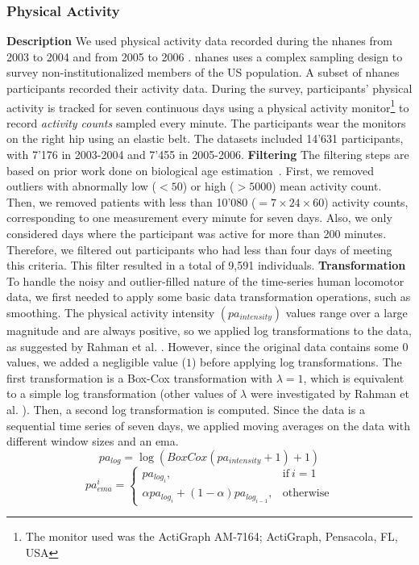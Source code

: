 \subsubsection{Physical Activity}
\textbf{Description} We used physical activity data recorded during the \gls{nhanes} from 2003 to 2004 \cite{cdc_nhanes_2003} and from 2005 to 2006 \cite{cdc_nhanes_2005}. 
\gls{nhanes} uses a complex sampling design to survey non-institutionalized members of the US population.
A subset of \gls{nhanes} participants recorded their activity data. During the survey, participants' physical activity is tracked for seven continuous days using a physical activity monitor\footnote{The monitor used was the ActiGraph AM-7164; ActiGraph, Pensacola, FL, USA} to record \textit{activity counts} sampled every minute. 
The participants wear the monitors on the right hip using an elastic belt.
The datasets included 14'631 participants, with 7'176 in 2003-2004 and 7'455 in 2005-2006.
\textbf{Filtering} The filtering steps are based on prior work done on biological age estimation~\cite{pyrkov_extracting_2018, rahman_deep_2019, shim_wearable-based_2023}. First, we removed outliers with abnormally low ($< 50$) or high ($>5000$) mean activity count. Then, we removed patients with less than 10'080 ($= 7 \times 24 \times 60$) activity counts, corresponding to one measurement every minute for seven days. Also, we only considered days where the participant was active for more than 200 minutes. Therefore, we filtered out participants who had less than four days of meeting this criteria. This filter resulted in a total of 9,591 individuals.
\textbf{Transformation} To handle the noisy and outlier-filled nature of the time-series human locomotor data, we first needed to apply some basic data transformation operations, such as smoothing.
The physical activity intensity $(pa_{intensity})$ values range over a large magnitude and are always positive, so we applied log transformations to the data, as suggested by Rahman et al. \cite{rahman_deep_2019}.
However, since the original data contains some $0$ values, we added a negligible value ($1$) before applying log transformations.
The first transformation is a Box-Cox \cite{box_analysis_1964} transformation with $\lambda = 1$, which is equivalent to a simple log transformation (other values of $\lambda$ were investigated by Rahman et al. \cite{rahman_deep_2019}).
Then, a second log transformation is computed. Since the data is a sequential time series of seven days, we applied moving averages on the data with different window sizes and an \gls{ema}. 
\begin{equation}
    pa_{log} = \log(BoxCox(pa_{intensity} + 1) + 1)
\end{equation}
\begin{equation}
    pa_{ema}^i = 
    \begin{cases}
      pa_{log_i}, & \mathrm{if}\ i=1 \\
      \alpha pa_{log_i} + (1 - \alpha) pa_{log_{i-1}}, & \mathrm{otherwise}
    \end{cases}
\end{equation}

